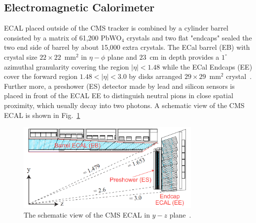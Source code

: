 \subsection{Electromagnetic Calorimeter}
ECAL placed outside of the CMS tracker is combined by a cylinder barrel consisted by a matrix of 61,200 PbWO$_4$ crystals and two flat "endcaps" sealed the two end side of barrel by about 15,000 extra crystals. The ECal barrel (EB) with crystal size $22\times 22$~mm$^2$ in $\eta-\phi$ plane and $23$~cm in depth provides a $1^\circ$ azimuthal granularity covering the region $|\eta|<1.48$ while the ECal Endcaps (EE) cover the forward region $1.48<|\eta|<3.0$ by disks arranged $29\times29$~mm$^2$ crystal~\cite{Bayatian:2006nff}. Further more, a preshower (ES) detector made by lead and silicon sensors is placed in front of the ECAL EE to distinguish neutral pions in close spatial proximity, which usually decay into two photons. A schematic view of the CMS ECAL is shown in Fig.~\ref{fig:cms_ecal}

\begin{figure}[ht]
  \begin{center}
    \includegraphics[width=0.8\textwidth]{figures/detector/CMS_ECAL.png}
  \end{center}
  \caption{The schematic view of the CMS ECAL in $y-z$ plane~\cite{Bayatian:2006nff}.}
  \label{fig:cms_ecal}
\end{figure}

